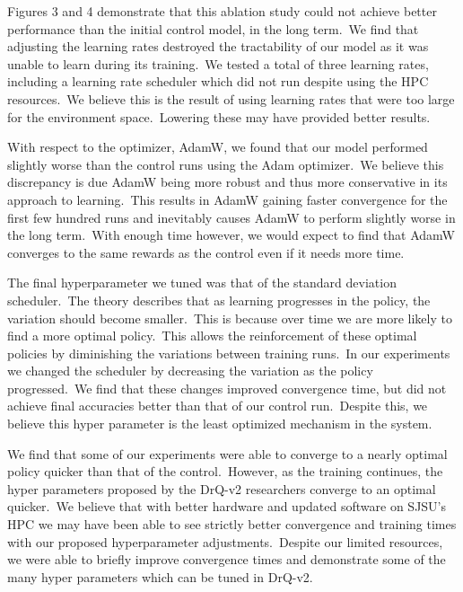 \documentclass[conference]{./IEEEtran/IEEEtran} %
\begin{document}
    Figures 3 and 4 demonstrate that this ablation study could not achieve better performance than the initial control model, in
    the long term.\ We find that adjusting the learning rates destroyed the tractability of our model as it was unable to learn
    during its training.\ We tested a total of three learning rates, including a learning rate scheduler which did not run despite
    using the HPC resources.\ We believe this is the result of using learning rates that were too large for the environment space.\
    Lowering these may have provided better results.\

    With respect to the optimizer, AdamW, we found that our model performed slightly worse than the control runs using the Adam
    optimizer.\ We believe this discrepancy is due AdamW being more robust and thus more conservative in its approach to learning.\
    This results in AdamW gaining faster convergence for the first few hundred runs and inevitably causes AdamW to perform
    slightly worse in the long term.\ With enough time however, we would expect to find that AdamW converges to the same rewards
    as the control even if it needs more time.\

    The final hyperparameter we tuned was that of the standard deviation scheduler.\ The theory describes that as learning
    progresses in the policy, the variation should become smaller.\ This is because over time we are more likely to find a more
    optimal policy.\ This allows the reinforcement of these optimal policies by diminishing the variations between training runs.\
    In our experiments we changed the scheduler by decreasing the variation as the policy progressed.\  We find that these changes
    improved convergence time, but did not achieve final accuracies better than that of our control run.\ Despite this, we
    believe this hyper parameter is the least optimized mechanism in the system.\

    We find that some of our experiments were able to converge to a nearly optimal policy quicker than that of the
    control.\ However, as the training continues, the hyper parameters proposed by the DrQ-v2 researchers converge to an optimal
    quicker.\ We believe that with better hardware and updated software on SJSU's HPC we may have been able to see strictly better
    convergence and training times with our proposed hyperparameter adjustments.\ Despite our limited resources, we were able to
    briefly improve convergence times and demonstrate some of the many hyper parameters which can be tuned in DrQ-v2.\
\end{document}
